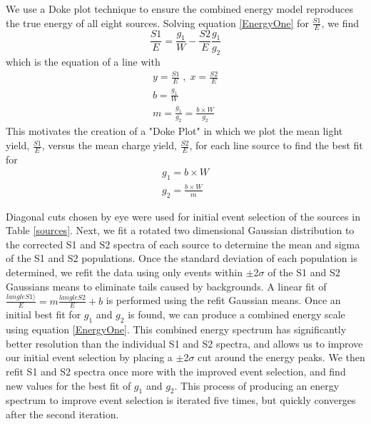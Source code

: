 \documentclass[a4paper,12pt]{article}
\begin{document}
{We use a Doke plot technique to ensure the combined energy model reproduces the true energy of all eight sources. \cite{Doke,Dobi}  Solving equation \ref{EnergyOne} for $\frac{S1}{E}$, we find
\begin{equation}\label{four}
\frac{S1}{E} = \frac{g_1}{W} - \frac{S2}{E}\frac{g_1}{g_2}
\end{equation}
which is the equation of a line with
\begin{subequations}
\begin{align}
y=\frac{S1}{E} \; , \; x=\frac{S2}{E} \\
b=\frac{g_1}{W} \\
m=\frac{g_1}{g_2}=\frac{b \times W}{g_2}
\end{align}
\end{subequations}
This motivates the creation of a "Doke Plot" in which we plot the mean light yield, $\frac{S1}{E}$, versus the mean charge yield, $\frac{S2}{E}$, for each line source to find the best fit for
\begin{subequations}\label{six}
\begin{align}
g_1 = b \times W \\
g_2 = \frac{b \times W}{m}
\end{align}
\end{subequations}

Diagonal cuts chosen by eye were used for initial event selection of the sources in Table \ref{sources}. Next, we fit a rotated two dimensional Gaussian distribution to the corrected S1 and S2 spectra of each source to determine the mean and sigma of the S1 and S2 populations. Once the standard deviation of each population is determined, we refit the data using only events within $\pm$2$\sigma$ of the S1 and S2 Gaussians means to eliminate tails caused by backgrounds.  A linear fit of $\frac{langle S1 \rangle}{E} = m \frac{langle S2}{E} + b$ is performed using the refit Gaussian means.  Once an initial best fit for $g_1$ and $g_2$ is found, we can produce a combined energy scale using equation \ref{EnergyOne}.  This combined energy spectrum has significantly better resolution than the individual S1 and S2 spectra, and allows us to improve our initial event selection by placing a $\pm$2$\sigma$ cut around the energy peaks.  We then refit S1 and S2 spectra once more with the improved event selection, and find new values for the best fit of $g_1$ and $g_2$.  This process of producing an energy spectrum to improve event selection is iterated five times, but quickly converges after the second iteration.

}
\end{document}
